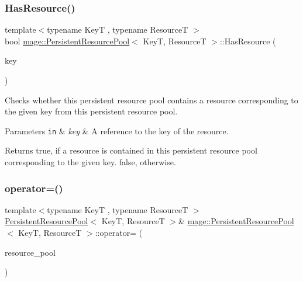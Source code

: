 \subsubsection{\texorpdfstring{Has\+Resource()}{HasResource()}}
{\footnotesize\ttfamily template$<$typename KeyT , typename ResourceT $>$ \\
bool \hyperlink{classmage_1_1_persistent_resource_pool}{mage\+::\+Persistent\+Resource\+Pool}$<$ KeyT, ResourceT $>$\+::Has\+Resource (\begin{DoxyParamCaption}\item[{const KeyT \&}]{key }\end{DoxyParamCaption})\hspace{0.3cm}{\ttfamily [noexcept]}}

Checks whether this persistent resource pool contains a resource corresponding to the given key from this persistent resource pool.


\begin{DoxyParams}[1]{Parameters}
\mbox{\tt in}  & {\em key} & A reference to the key of the resource. \\
\hline
\end{DoxyParams}
\begin{DoxyReturn}{Returns}
{\ttfamily true}, if a resource is contained in this persistent resource pool corresponding to the given key. {\ttfamily false}, otherwise. 
\end{DoxyReturn}
\hypertarget{classmage_1_1_persistent_resource_pool_a14b9be5f6ac88941b12a3d63a9e6e127}{}\label{classmage_1_1_persistent_resource_pool_a14b9be5f6ac88941b12a3d63a9e6e127} 
\subsubsection{\texorpdfstring{operator=()}{operator=()}\hspace{0.1cm}{\footnotesize\ttfamily [1/2]}}
{\footnotesize\ttfamily template$<$typename KeyT , typename ResourceT $>$ \\
\hyperlink{classmage_1_1_persistent_resource_pool}{Persistent\+Resource\+Pool}$<$ KeyT, ResourceT $>$\& \hyperlink{classmage_1_1_persistent_resource_pool}{mage\+::\+Persistent\+Resource\+Pool}$<$ KeyT, ResourceT $>$\+::operator= (\begin{DoxyParamCaption}\item[{const \hyperlink{classmage_1_1_persistent_resource_pool}{Persistent\+Resource\+Pool}$<$ KeyT, ResourceT $>$ \&}]{resource\+\_\+pool }\end{DoxyParamCaption})\hspace{0.3cm}{\ttfamily [delete]}}

